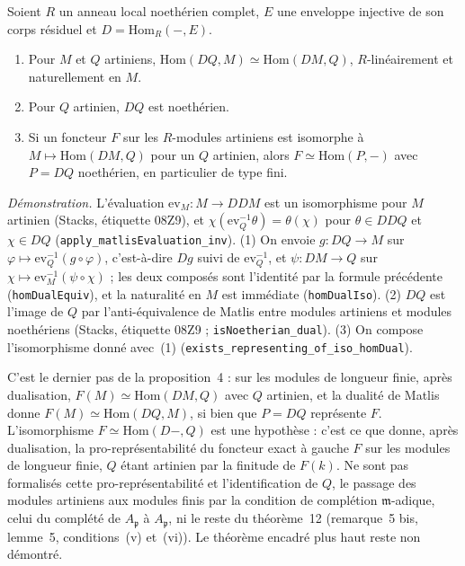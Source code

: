 \begin{encadre}
\begin{enonce}
Soient $R$ un anneau local noethérien complet, $E$ une enveloppe injective de son corps résiduel et $D = \mathrm{Hom}_R(-, E)$.
\begin{enumerate}
\item Pour $M$ et $Q$ artiniens, $\mathrm{Hom}(DQ, M) \simeq \mathrm{Hom}(DM, Q)$, $R$-linéairement et naturellement en $M$.
\item Pour $Q$ artinien, $DQ$ est noethérien.
\item Si un foncteur $F$ sur les $R$-modules artiniens est isomorphe à $M \mapsto \mathrm{Hom}(DM, Q)$ pour un $Q$ artinien, alors $F \simeq \mathrm{Hom}(P, -)$ avec $P = DQ$ noethérien, en particulier de type fini.
\end{enumerate}
\end{enonce}
\end{encadre}
{\small \emph{Démonstration.} L'évaluation $\mathrm{ev}_M : M \to DDM$ est un isomorphisme pour $M$ artinien (Stacks, étiquette 08Z9), et $\chi(\mathrm{ev}_Q^{-1}\theta) = \theta(\chi)$ pour $\theta \in DDQ$ et $\chi \in DQ$ (\texttt{apply\_matlisEvaluation\_inv}). (1) On envoie $g : DQ \to M$ sur $\varphi \mapsto \mathrm{ev}_Q^{-1}(g \circ \varphi)$, c'est-à-dire $Dg$ suivi de $\mathrm{ev}_Q^{-1}$, et $\psi : DM \to Q$ sur $\chi \mapsto \mathrm{ev}_M^{-1}(\psi \circ \chi)$ ; les deux composés sont l'identité par la formule précédente (\texttt{homDualEquiv}), et la naturalité en $M$ est immédiate (\texttt{homDualIso}). (2) $DQ$ est l'image de $Q$ par l'anti-équivalence de Matlis entre modules artiniens et modules noethériens (Stacks, étiquette 08Z9 ; \texttt{isNoetherian\_dual}). (3) On compose l'isomorphisme donné avec~(1) (\texttt{exists\_representing\_of\_iso\_homDual}).

C'est le dernier pas de la proposition~4 : sur les modules de longueur finie, après dualisation, $F(M) \simeq \mathrm{Hom}(DM, Q)$ avec $Q$ artinien, et la dualité de Matlis donne $F(M) \simeq \mathrm{Hom}(DQ, M)$, si bien que $P = DQ$ représente $F$. L'isomorphisme $F \simeq \mathrm{Hom}(D-, Q)$ est une hypothèse : c'est ce que donne, après dualisation, la pro-représentabilité du foncteur exact à gauche $F$ sur les modules de longueur finie, $Q$ étant artinien par la finitude de $F(k)$. Ne sont pas formalisés cette pro-représentabilité et l'identification de $Q$, le passage des modules artiniens aux modules finis par la condition de complétion $\mathfrak m$-adique, celui du complété de $A_{\mathfrak p}$ à $A_{\mathfrak p}$, ni le reste du théorème~12 (remarque~5 bis, lemme~5, conditions~(v) et~(vi)). Le théorème encadré plus haut reste non démontré.\par}


